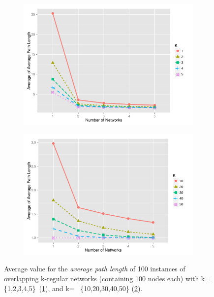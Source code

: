 \documentclass[preprint,number]{elsarticle}
\begin{document}
\begin{figure}[H]
	\centering
	\begin{subfigure}{.5\linewidth}
		\centering
		\includegraphics[width=1\linewidth]{"../analysis/pdf/network_properties_apl_line_kreg_12345"}
		\caption{}
		\label{fig:network_properties_apl_line_kreg_12345}
	\end{subfigure}%
	\begin{subfigure}{.5\linewidth}
		\centering
		\includegraphics[width=1\linewidth]{"../analysis/pdf/network_properties_apl_line_kreg_1020304050"}
		\caption{}
		\label{fig:network_properties_apl_line_kreg_1020304050}
	\end{subfigure}
	\begin{minipage}{0.9\textwidth}
		\vspace{0.2cm}
		\caption{Average value for the \textit{average path length} of 100 instances of overlapping k-regular networks (containing 100 nodes each) with k=\{1,2,3,4,5\}~(\ref{fig:network_properties_apl_line_kreg_12345}), and k= ~\{10,20,30,40,50\} (\ref{fig:network_properties_apl_line_kreg_1020304050}).}
		\label{fig:network_properties_apl_line_kreg}
	\end{minipage}
\end{figure}
\end{document}
